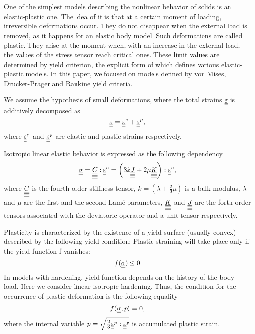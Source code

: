 \documentclass[12pt]{article}
\begin{document}
One of the simplest models describing the nonlinear behavior of solids is an elastic-plastic one. The idea of it is that at a certain moment of loading, irreversible deformations occur. They do not disappear when the external load is removed, as it happens for an elastic body model. Such deformations are called plastic. They arise at the moment when, with an increase in the external load, the values of the stress tensor reach critical ones. These limit values are determined by yield criterion, the explicit form of which defines various elastic-plastic models. In this paper, we focused on models defined by von Mises, Drucker-Prager and Rankine yield criteria. 

We assume the hypothesis of small deformations, where the total strains $\underline{\underline{\varepsilon}}$ is additively decomposed as
\begin{equation}\label{eqn:eps_dec}
    \underline{\underline{\varepsilon}} = \underline{\underline{\varepsilon}}^e + \underline{\underline{\varepsilon}}^p,
\end{equation}
where $\underline{\underline{\varepsilon}}^e$ and $\underline{\underline{\varepsilon}}^p$ are elastic and plastic strains respectively.

Isotropic linear elastic behavior is expressed as the following dependency
\begin{equation}
    \underline{\underline{\sigma}} = \underline{\underline{\underline{\underline{C_{}}}}} : \underline{\underline{\varepsilon}}^e = \left( 3k\underline{\underline{\underline{\underline{J}}}} + 2\mu\underline{\underline{\underline{\underline{K}}}} \right) : \underline{\underline{\varepsilon}}^e,
\end{equation}
where $\underline{\underline{\underline{\underline{C_{}}}}}$ is the fourth-order stiffness tensor, $k = (\lambda + \frac{2}{3}\mu)$ is a bulk modulus, $\lambda$ and $\mu$ are the first and the second Lamé parameters, $\underline{\underline{\underline{\underline{K}}}}$ and $\underline{\underline{\underline{\underline{J}}}}$ are the forth-order tensors associated with the deviatoric operator and a unit tensor respectively.

Plasticity is characterized by the existence of a yield surface (usually convex) described by the following yield condition:
Plastic straining will take place only if the yield function f vanishes:
\begin{equation}
    f(\underline{\underline{\sigma}}) \leq 0
\end{equation}
In models with hardening, yield function depends on the history of the body load. Here we consider linear isotropic hardening. Thus, the condition for the occurrence of plastic deformation is the following equality
\begin{equation}
    f(\underline{\underline{\sigma}}, p) = 0, 
\end{equation}
where the internal variable $p = \sqrt{\frac{2}{3}\underline{\underline{\varepsilon}}^p : \underline{\underline{\varepsilon}}^p}$ is accumulated plastic strain.
\end{document}
